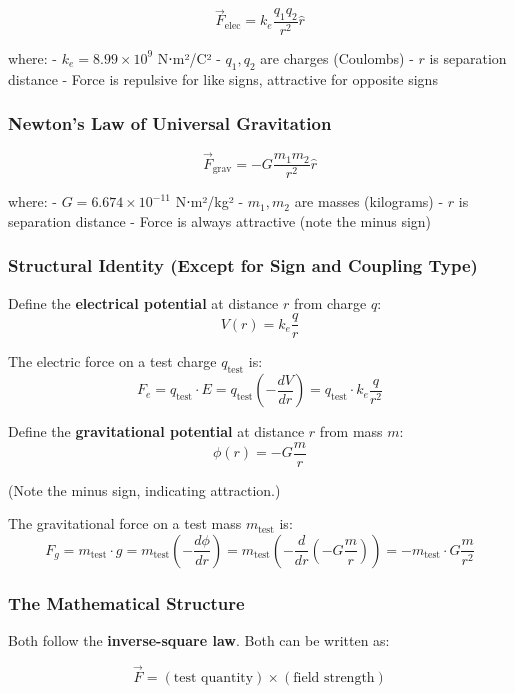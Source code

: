 \documentclass[
]{article}
\begin{document}
\[\vec{F}_{\text{elec}} = k_e \frac{q_1 q_2}{r^2} \hat{r}\]

where: - \(k_e = 8.99 \times 10^9\) N⋅m²/C² - \(q_1, q_2\) are charges
(Coulombs) - \(r\) is separation distance - Force is repulsive for like
signs, attractive for opposite signs

\subsubsection{Newton's Law of Universal
Gravitation}\label{newtons-law-of-universal-gravitation}

\[\vec{F}_{\text{grav}} = -G \frac{m_1 m_2}{r^2} \hat{r}\]

where: - \(G = 6.674 \times 10^{-11}\) N⋅m²/kg² - \(m_1, m_2\) are
masses (kilograms) - \(r\) is separation distance - Force is always
attractive (note the minus sign)

\subsubsection{Structural Identity (Except for Sign and Coupling
Type)}\label{structural-identity-except-for-sign-and-coupling-type}

Define the \textbf{electrical potential} at distance \(r\) from charge
\(q\): \[V(r) = k_e \frac{q}{r}\]

The electric force on a test charge \(q_{\text{test}}\) is:
\[F_e = q_{\text{test}} \cdot E = q_{\text{test}} \left(-\frac{dV}{dr}\right) = q_{\text{test}} \cdot k_e \frac{q}{r^2}\]

Define the \textbf{gravitational potential} at distance \(r\) from mass
\(m\): \[\phi(r) = -G \frac{m}{r}\]

(Note the minus sign, indicating attraction.)

The gravitational force on a test mass \(m_{\text{test}}\) is:
\[F_g = m_{\text{test}} \cdot g = m_{\text{test}} \left(-\frac{d\phi}{dr}\right) = m_{\text{test}} \left(-\frac{d}{dr}\left(-G\frac{m}{r}\right)\right) = -m_{\text{test}} \cdot G \frac{m}{r^2}\]

\subsubsection{The Mathematical
Structure}\label{the-mathematical-structure}

Both follow the \textbf{inverse-square law}. Both can be written as:

\[\vec{F} = (\text{test quantity}) \times (\text{field strength})\]
\end{document}
